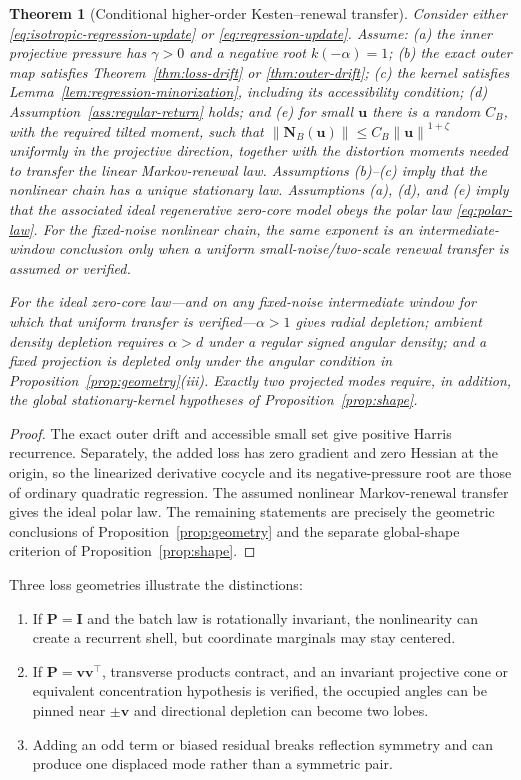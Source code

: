\documentclass[10pt]{article}
\newtheorem{theorem}{Theorem}[section]
\theoremstyle{definition}
\theoremstyle{remark}
\newcommand{\norm}[1]{\left\lVert#1\right\rVert}
\newcommand{\Id}{\mathbf I}
\newcommand{\uvec}{\mathbf u}
\newcommand{\vvec}{\mathbf v}
\begin{document}
\begin{theorem}[Conditional higher-order Kesten--renewal transfer]
\label{thm:higher-order-regression}
Consider either \eqref{eq:isotropic-regression-update} or
\eqref{eq:regression-update}.  Assume: (a) the inner projective pressure has
$\gamma>0$ and a negative root $k(-\alpha)=1$; (b) the exact outer map
satisfies Theorem~\ref{thm:loss-drift} or \ref{thm:outer-drift}; (c) the
kernel satisfies Lemma~\ref{lem:regression-minorization}, including its
accessibility condition; (d) Assumption~\ref{ass:regular-return} holds; and
(e) for small $\uvec$ there is a random $C_B$, with the required tilted
moment, such that
$\norm{\mathbf N_B(\uvec)}\le C_B\norm{\uvec}^{1+\zeta}$ uniformly in the
projective direction, together with the distortion moments needed to transfer
the linear Markov-renewal law.  Assumptions (b)--(c) imply that
the nonlinear chain has a unique stationary law.  Assumptions (a), (d), and
(e) imply that the associated ideal regenerative zero-core model obeys the
polar law \eqref{eq:polar-law}.  For the fixed-noise nonlinear chain, the
same exponent is an intermediate-window conclusion only when a uniform
small-noise/two-scale renewal transfer is assumed or verified.

For the ideal zero-core law---and on any fixed-noise intermediate window for
which that uniform transfer is verified---$\alpha>1$ gives radial depletion;
ambient density depletion requires $\alpha>d$ under a regular signed angular density; and a fixed projection
is depleted only under the angular condition in
Proposition~\ref{prop:geometry}(iii).  Exactly two projected modes require,
in addition, the global stationary-kernel hypotheses of
Proposition~\ref{prop:shape}.
\end{theorem}

\begin{proof}
The exact outer drift and accessible small set give positive Harris
recurrence.  Separately, the added loss has zero gradient and zero Hessian at
the origin, so the linearized derivative cocycle and its negative-pressure
root are those of ordinary quadratic regression.  The assumed nonlinear
Markov-renewal transfer gives the ideal polar law.  The remaining statements are precisely the geometric
conclusions of Proposition~\ref{prop:geometry} and the separate global-shape
criterion of Proposition~\ref{prop:shape}.
\end{proof}

Three loss geometries illustrate the distinctions:
\begin{enumerate}
\item If $\mathbf P=\Id$ and the batch law is rotationally invariant, the
nonlinearity can create a recurrent shell, but coordinate marginals may stay
centered.
\item If $\mathbf P=\vvec\vvec^\top$, transverse products contract, and an
invariant projective cone or equivalent concentration hypothesis is verified,
the occupied angles can be pinned near $\pm\vvec$ and directional depletion
can become two lobes.
\item Adding an odd term or biased residual breaks reflection symmetry and can
produce one displaced mode rather than a symmetric pair.
\end{enumerate}
\end{document}
